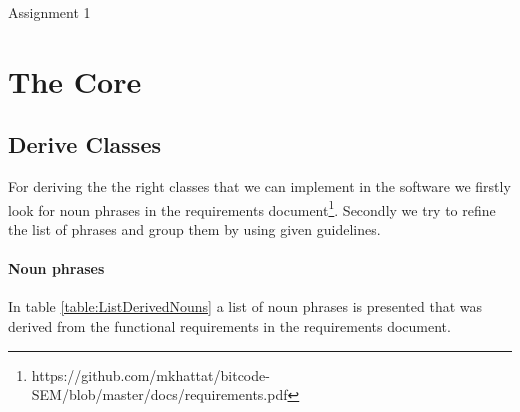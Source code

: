 \documentclass{article}
\begin{document}

\begin{titlepage}
	\Huge{Assignment 1}
\end{titlepage}


\section{The Core}

\subsection{Derive Classes}
For deriving the the right classes that we can implement in the software we firstly look for noun phrases in the requirements document\footnote{https://github.com/mkhattat/bitcode-SEM/blob/master/docs/requirements.pdf}. Secondly we try to refine the list of phrases and group them by using given guidelines.

\paragraph{Noun phrases}
In table \ref{table:ListDerivedNouns} a list of noun phrases is presented that was derived from the functional requirements in the requirements document.
\end{document}
